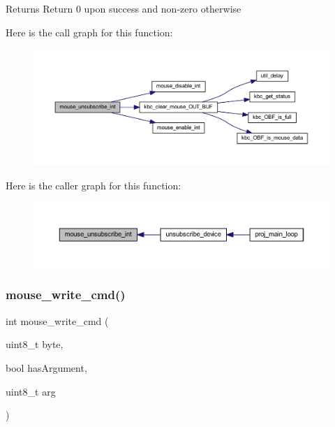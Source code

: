 \begin{DoxyReturn}{Returns}
Return 0 upon success and non-\/zero otherwise 
\end{DoxyReturn}
Here is the call graph for this function\+:\nopagebreak
\begin{figure}[H]
\begin{center}
\leavevmode
\includegraphics[width=350pt]{group__mouse_ga685ad2706aca36d9869a30a19b9f446a_cgraph}
\end{center}
\end{figure}
Here is the caller graph for this function\+:\nopagebreak
\begin{figure}[H]
\begin{center}
\leavevmode
\includegraphics[width=350pt]{group__mouse_ga685ad2706aca36d9869a30a19b9f446a_icgraph}
\end{center}
\end{figure}
\mbox{\label{group__mouse_ga14261d6dca45cb7cc9c8a786739ac5a3}} 
\subsubsection{\texorpdfstring{mouse\+\_\+write\+\_\+cmd()}{mouse\_write\_cmd()}}
{\footnotesize\ttfamily int mouse\+\_\+write\+\_\+cmd (\begin{DoxyParamCaption}\item[{uint8\+\_\+t}]{byte,  }\item[{bool}]{has\+Argument,  }\item[{uint8\+\_\+t}]{arg }\end{DoxyParamCaption})}



